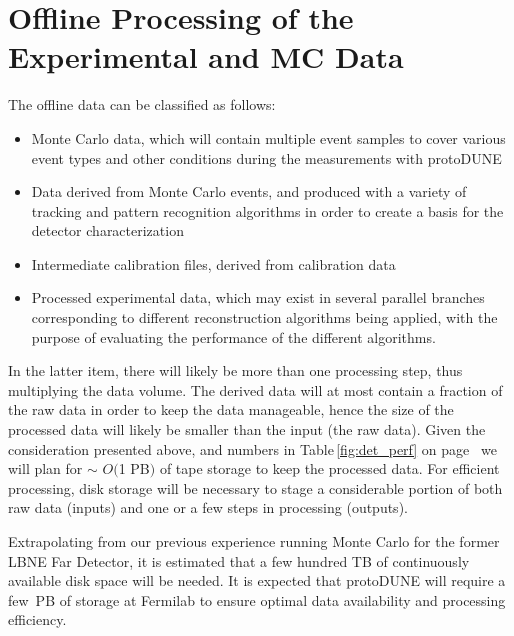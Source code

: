 \section{Offline Processing of the Experimental and MC Data}

The offline data can be classified as follows:
\begin{itemize}
\item Monte Carlo data, which will contain multiple event samples to cover various event types and other conditions during the measurements
with protoDUNE

\item Data derived from Monte Carlo events, and produced with a variety of tracking and pattern recognition algorithms
in order to create a basis for the detector characterization

\item Intermediate calibration files, derived from calibration data

\item Processed experimental data, which may exist in several parallel branches corresponding to different reconstruction
algorithms being applied, with the purpose of evaluating the performance of the different algorithms.
\end{itemize}

\noindent In the latter item, there will likely be more than one processing step, thus multiplying the data volume. 
The derived data will at most contain a fraction of the raw data in order to keep the data manageable,
hence the size of the processed data will likely be smaller than the input (the raw data). 
Given the consideration presented above, and numbers in Table\,\ref{fig:det_perf}
on page~\pageref{fig:det_perf} we will plan for
$\sim$ $O($1 PB$)$ of tape storage to keep the processed data. 
For efficient processing, disk storage will be necessary
to stage a considerable portion of both raw data (inputs) and one or a few steps in processing (outputs).

Extrapolating from our previous experience running Monte Carlo for the former LBNE Far Detector, it is estimated
that  a few hundred TB of continuously available disk space will be needed. It is expected that protoDUNE will require
a few~PB of storage at Fermilab to ensure optimal data availability and  processing efficiency. 

